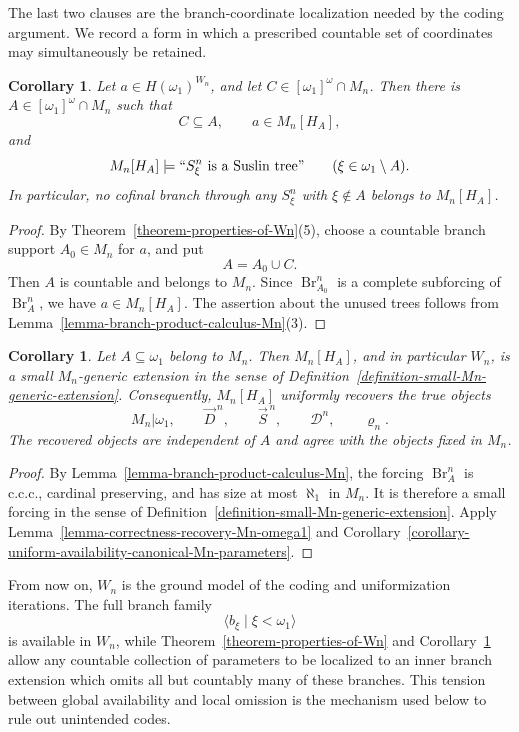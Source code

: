\documentclass[a4paper,11pt]{article}
\newtheorem{corollary}[theorem]{Corollary}
\begin{document}
The last two clauses are the branch-coordinate localization needed by the
coding argument.  We record a form in which a prescribed countable set of
coordinates may simultaneously be retained.

\begin{corollary}
\label{corollary-countable-branch-supports-Mn}
Let $a\in H(\omega_1)^{W_n}$, and let
$C\in[\omega_1]^\omega\cap M_n$.  Then there is
$A\in[\omega_1]^\omega\cap M_n$ such that
\[
   C\subseteq A,
   \qquad
   a\in M_n[H_A],
\]
and
\[
   M_n[H_A]\models
   ``S^n_\xi\text{ is a Suslin tree}"
   \qquad(\xi\in\omega_1\setminus A).
\]
In particular, no cofinal branch through any $S^n_\xi$ with
$\xi\notin A$ belongs to $M_n[H_A]$.
\end{corollary}

\begin{proof}
By Theorem~\ref{theorem-properties-of-Wn}(5), choose a countable branch support
$A_0\in M_n$ for $a$, and put
\[
   A=A_0\cup C.
\]
Then $A$ is countable and belongs to $M_n$.  Since
$\operatorname{Br}^n_{A_0}$ is a complete subforcing of
$\operatorname{Br}^n_A$, we have $a\in M_n[H_A]$.  The assertion about the
unused trees follows from
Lemma~\ref{lemma-branch-product-calculus-Mn}(3).
\end{proof}

\begin{corollary}
\label{corollary-canonical-parameters-branch-subextensions-Mn}
Let $A\subseteq\omega_1$ belong to $M_n$.  Then $M_n[H_A]$, and in
particular $W_n$, is a small $M_n$-generic extension in the sense of
Definition~\ref{definition-small-Mn-generic-extension}.  Consequently,
$M_n[H_A]$ uniformly recovers the true objects
\[
   M_n|\omega_1,
   \qquad
   \vec D^{\,n},
   \qquad
   \vec S^{\,n},
   \qquad
   \mathcal D^n,
   \qquad
   \varrho_n.
\]
The recovered objects are independent of $A$ and agree with the objects fixed
in $M_n$.
\end{corollary}

\begin{proof}
By Lemma~\ref{lemma-branch-product-calculus-Mn}, the forcing
$\operatorname{Br}^n_A$ is c.c.c., cardinal preserving, and has size at most
$\aleph_1$ in $M_n$.  It is therefore a small forcing in the sense of
Definition~\ref{definition-small-Mn-generic-extension}.  Apply
Lemma~\ref{lemma-correctness-recovery-Mn-omega1} and
Corollary~\ref{corollary-uniform-availability-canonical-Mn-parameters}.
\end{proof}

From now on, $W_n$ is the ground model of the coding and uniformization
iterations.  The full branch family
\[
   \langle b_\xi\mid\xi<\omega_1\rangle
\]
is available in $W_n$, while
Theorem~\ref{theorem-properties-of-Wn} and
Corollary~\ref{corollary-countable-branch-supports-Mn} allow any countable
collection of parameters to be localized to an inner branch extension which
omits all but countably many of these branches.  This tension between global
availability and local omission is the mechanism used below to rule out
unintended codes.
\end{document}
